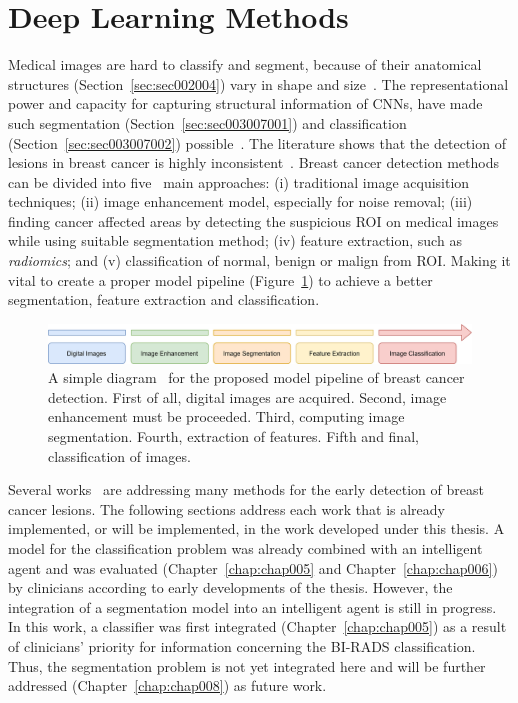 \section{Deep Learning Methods}
\label{sec:sec003007}

Medical images are hard to classify and segment, because of their anatomical structures (Section~\ref{sec:sec002004}) vary in shape and size~\cite{10.1007/978-3-030-00934-2_99}.
The representational power and capacity for capturing structural information of \acp{CNN}, have made such segmentation (Section~\ref{sec:sec003007001}) and classification (Section~\ref{sec:sec003007002}) possible~\cite{Hou_2016_CVPR, 10.1007/978-3-319-24574-4_28}.
The literature shows that the detection of lesions in breast cancer is highly inconsistent~\cite{shen2019deep, s20143903}.
Breast cancer detection methods can be divided into five~\cite{s20143903} main approaches:
(i) traditional image acquisition techniques;
(ii) image enhancement model, especially for noise removal;
(iii) finding cancer affected areas by detecting the suspicious \ac{ROI} on medical images while using suitable segmentation method;
(iv) feature extraction, such as {\it radiomics}; and
(v) classification of normal, benign or malign from \ac{ROI}.
Making it vital to create a proper model pipeline (Figure~\ref{fig:fig027}) to achieve a better segmentation, feature extraction and classification.

\begin{figure}[htbp]
\centering
\includegraphics[width=\columnwidth]{images/fig027}
\caption{A simple diagram~\cite{s20143903} for the proposed model pipeline of breast cancer detection. First of all, digital images are acquired. Second, image enhancement must be proceeded. Third, computing image segmentation. Fourth, extraction of features. Fifth and final, classification of images.}
\label{fig:fig027}
\end{figure}

Several works~\cite{ammar2015semantically, wang2018support, milosevic2017comparison} are addressing many methods for the early detection of breast cancer lesions.
The following sections address each work that is already implemented, or will be implemented, in the work developed under this thesis.
A model for the classification problem was already combined with an intelligent agent and was evaluated (Chapter~\ref{chap:chap005} and Chapter~\ref{chap:chap006}) by clinicians according to early developments of the thesis.
However, the integration of a segmentation model into an intelligent agent is still in progress.
In this work, a classifier was first integrated (Chapter~\ref{chap:chap005}) as a result of clinicians' priority for information concerning the \ac{BI-RADS} classification.
Thus, the segmentation problem is not yet integrated here and will be further addressed (Chapter~\ref{chap:chap008}) as future work.

